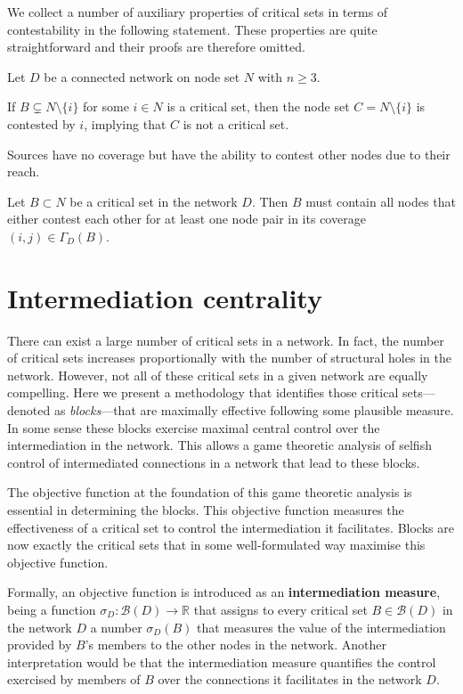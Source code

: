 \bigskip\noindent
We collect a number of auxiliary properties of critical sets in terms of contestability in the following statement. These properties are quite straightforward and their proofs are therefore omitted.
\begin{property}
Let $D$ be a connected network on node set $N$ with $n \geqslant 3$.
\begin{numm}
\item If $B \subsetneq N \setminus \{ i \}$ for some $i \in N$ is a critical set, then the node set $C = N \setminus \{ i \}$ is contested by $i$, implying that $C$ is not a critical set.

\item Sources have no coverage but have the ability to contest other nodes due to their reach.

\item Let $B \subset N$ be a critical set in the network $D$. Then $B$ must contain all nodes that either contest each other for at least one node pair in its coverage $(i,j) \in \Gamma_D (B)$.
\end{numm}
\end{property}

\section{Intermediation centrality}

There can exist a large number of critical sets in a network. In fact, the number of critical sets increases proportionally with the number of structural holes \citep{Burt2002} in the network. However, not all of these critical sets in a given network are equally compelling. Here we present a methodology that identifies those critical sets---denoted as \emph{blocks}---that are maximally effective following some plausible measure. In some sense these blocks exercise maximal central control over the intermediation in the network. This allows a game theoretic analysis of selfish control of intermediated connections in a network that lead to these blocks.

The objective function at the foundation of this game theoretic analysis is essential in determining the blocks. This objective function measures the effectiveness of a critical set to control the intermediation it facilitates. Blocks are now exactly the critical sets that in some well-formulated way maximise this objective function.

Formally, an objective function is introduced as an \textbf{intermediation measure}, being a function $\sigma_D \colon \mathcal{B} (D) \to \mathbb{R}$ that assigns to every critical set $B \in \mathcal{B}(D)$ in the network $D$ a number $\sigma_D (B)$ that measures the value of the intermediation provided by $B$'s members to the other nodes in the network. Another interpretation would be that the intermediation measure quantifies the control exercised by members of $B$ over the connections it facilitates in the network $D$.

